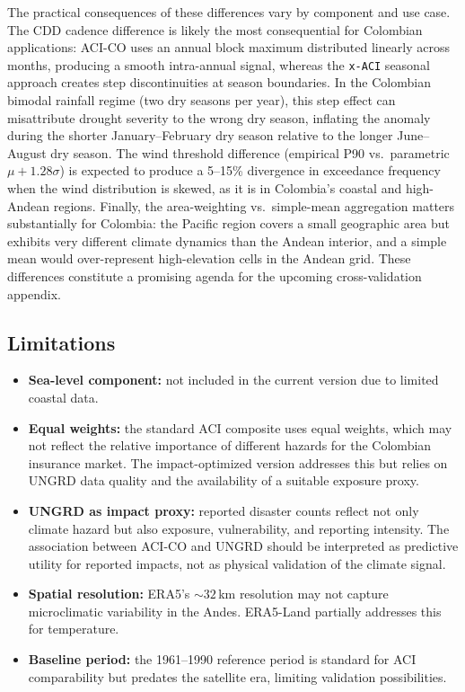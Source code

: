 \documentclass[12pt]{article}
\begin{document}
The practical consequences of these differences vary by component and use case. The CDD cadence difference is likely the most consequential for Colombian applications: ACI-CO uses an annual block maximum distributed linearly across months, producing a smooth intra-annual signal, whereas the \texttt{x-ACI} seasonal approach creates step discontinuities at season boundaries. In the Colombian bimodal rainfall regime (two dry seasons per year), this step effect can misattribute drought severity to the wrong dry season, inflating the anomaly during the shorter January--February dry season relative to the longer June--August dry season. The wind threshold difference (empirical P90 vs.\ parametric $\mu + 1.28\sigma$) is expected to produce a 5--15\% divergence in exceedance frequency when the wind distribution is skewed, as it is in Colombia's coastal and high-Andean regions. Finally, the area-weighting vs.\, simple-mean aggregation matters substantially for Colombia: the Pacific region covers a small geographic area but exhibits very different climate dynamics than the Andean interior, and a simple mean would over-represent high-elevation cells in the Andean grid. These differences constitute a promising agenda for the upcoming cross-validation appendix.

\subsection{Limitations}
 
\begin{itemize}
\item \textbf{Sea-level component:} not included in the current version due to limited coastal data.
\item \textbf{Equal weights:} the standard ACI composite uses equal weights, which may not reflect the relative importance of different hazards for the Colombian insurance market. The impact-optimized version addresses this but relies on UNGRD data quality and the availability of a suitable exposure proxy.
\item \textbf{UNGRD as impact proxy:} reported disaster counts reflect not only climate hazard but also exposure, vulnerability, and reporting intensity. The association between ACI-CO and UNGRD should be interpreted as predictive utility for reported impacts, not as physical validation of the climate signal.
\item \textbf{Spatial resolution:} ERA5's ${\sim}32$\,km resolution may not capture microclimatic variability in the Andes. ERA5-Land partially addresses this for temperature.
\item \textbf{Baseline period:} the 1961--1990 reference period is standard for ACI comparability but predates the satellite era, limiting validation possibilities.
\end{itemize}
 
\end{document}
